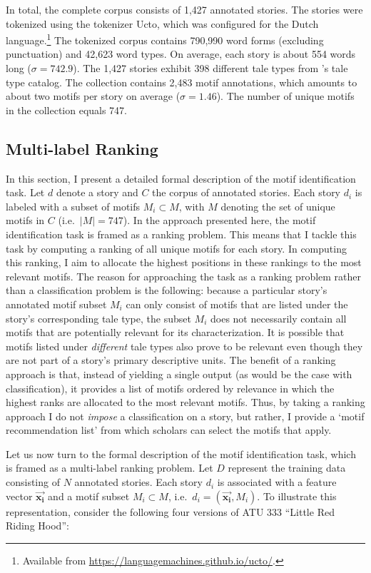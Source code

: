 In total, the complete corpus consists of 1,427 annotated stories. The stories were tokenized using the tokenizer Ucto, which was configured for the Dutch language.\footnote{Available from \url{https://languagemachines.github.io/ucto/}.} The tokenized corpus contains 790,990 word forms (excluding punctuation) and 42,623 word types. On average, each story is about 554 words long ($\sigma=742.9$). The 1,427 stories exhibit 398 different tale types from \citeauthor{uther:2004}'s tale type catalog. The collection contains 2,483 motif annotations, which amounts to about two motifs per story on average ($\sigma=1.46$). The number of unique motifs in the collection equals 747.

\subsection{Multi-label Ranking}\label{sec:multi-label-classification}

In this section, I present a detailed formal description of the motif identification task. Let $d$ denote a story and $C$ the corpus of annotated stories. Each story $d_i$ is labeled with a subset of motifs $M_i \subset M$, with $M$ denoting the set of unique motifs in $C$ (i.e.\ $|M|=747$). In the approach presented here, the motif identification task is framed as a ranking problem. This means that I tackle this task by computing a ranking of all unique motifs for each story. In computing this ranking, I aim to allocate the highest positions in these rankings to the most relevant motifs. The reason for approaching the task as a ranking problem rather than a classification problem is the following: because a particular story's annotated motif subset $M_i$ can only consist of motifs that are listed under the story's corresponding tale type, the subset $M_i$ does not necessarily contain all motifs that are potentially relevant for its characterization. It is possible that motifs listed under \emph{different} tale types also prove to be relevant even though they are not part of a story's primary descriptive units. The benefit of a ranking approach is that, instead of yielding a single output (as would be the case with classification), it provides a list of motifs ordered by relevance in which the highest ranks are allocated to the most relevant motifs. Thus, by taking a ranking approach I do not \emph{impose} a classification on a story, but rather, I provide a `motif recommendation list' from which scholars can select the motifs that apply.

Let us now turn to the formal description of the motif identification task, which is framed as a multi-label ranking problem. Let $D$ represent the training data consisting of $N$ annotated stories. Each story $d_i$ is associated with a feature vector $\vec{\mathbf{x_i}}$ and a motif subset $M_i \subset M$, i.e.\ $d_i = (\vec{\mathbf{x_i}}, M_i)$. To illustrate this representation, consider the following four versions of ATU 333 ``Little Red Riding Hood'':

